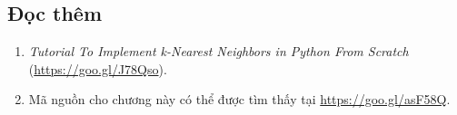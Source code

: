 











\subsection{Đọc thêm}



\begin{enumerate}
\item \textit{Tutorial To Implement k-Nearest Neighbors in Python From
Scratch} (\url{https://goo.gl/J78Qso}).

\item Mã nguồn cho chương này có thể được tìm thấy tại \url{https://goo.gl/asF58Q}.

\end{enumerate}
